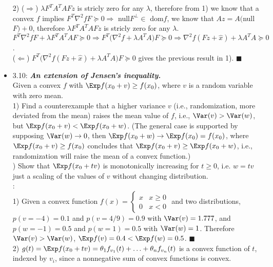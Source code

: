 \begin{itemize}
   2) ($\Rightarrow$) $\lambda F^TA^TAFz$ is stricly zero for any $\lambda$, therefore from 1) we
know that a convex $f$ implies $F^T\nabla^2fF \succeq 0 \Rightarrow$ %
null$F^\perp \in$ dom$f$, we know that $Az= A($null$F) + 0$, therefore $\lambda F^TA^TAFz$ is
stricly zero for any $\lambda$.  $F^T\nabla^2fF + \lambda F^T A^TAF \succeq 0 \Rightarrow
F^T\Big(\nabla^2f + \lambda A^TA \Big)F \succeq 0 \Rightarrow \nabla^2 f(Fz+\hat{x}) + \lambda A^TA
\succeq 0$. \\
   ($\Leftarrow$) $F^T\Big(\nabla^2 f(Fz+\hat{x}) + \lambda A^TA\Big)F \succeq 0$ gives the previous
result in 1).  $\blacksquare$

\item 3.10: {\bf\emph{An extension of Jensen’s inequality.}} \\ Given a convex $f$ with $\Exp
f(x_0+v) \ge f(x_0)$, where $v$ is a random variable with zero mean. \\ 1) Find a counterexample
that a higher variance $v$ (i.e., randomization, more deviated from the mean) raises the mean value
of $f$, i.e., $\Var(v) > \Var(w)$, but $\Exp f(x_0+v) < \Exp f(x_0+w)$.  (The general case is
supported by supposing $\Var(w) \rightarrow 0$, then $\Exp f(x_0+w) \rightarrow \Exp f(x_0)=
f(x_0)$, where $\Exp f(x_0+v) \ge f(x_0)$ concludes that $\Exp f(x_0+v) \ge \Exp f(x_0+w)$, i.e.,
randomization will raise the mean of a convex function.) \\ {) Show that $\Exp f(x_0+tv)$ is
monotonically increasing for $t\ge0$, i.e. $w=tv$ just a scaling of the values of $v$ without
changing distribution. \\ } \Proof: \\
   1) Given a convex function $ f(x) = \begin{cases} x & x \ge 0 \\ 0 & x<0 \end{cases}$ and two
distributions, $p(v=-4)=0.1$ and $p(v=4/9)=0.9$ with $\Var(v)=1.777$, and $p(w=-1)=0.5$ and
$p(w=1)=0.5$ with $\Var(w)=1$.  Therefore $\Var(v) > \Var(w)$, $\Exp f(v)= 0.4 < \Exp f(w)= 0.5$.
$\blacksquare$ \\ 2) $g(t)= \Exp f(x_0+tv)= \theta_1 f_{v_1}(t) + \dotsc + \theta_n f_{v_n}(t)$ is a
convex function of $t$, indexed by $v_i$, since a nonnegative sum of convex functions is convex.


\end{itemize}
